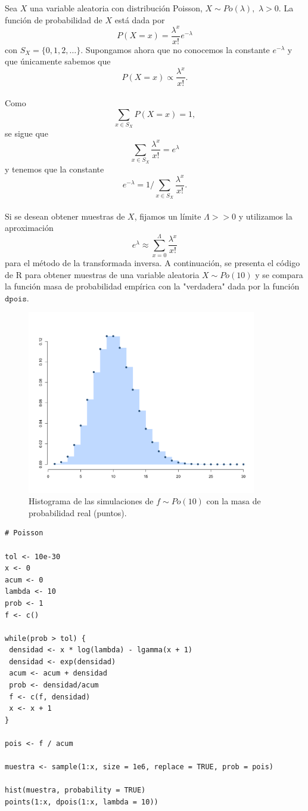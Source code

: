 \documentclass[11pt,a4paper]{article}
\begin{document}
Sea $X$ una variable aleatoria con distribución Poisson, $X \sim Po(\lambda),$ $\lambda > 0$. La función de probabilidad de $X$ está dada por
$$P(X = x) = \frac{\lambda ^ x}{x!}e^{-\lambda}$$ con $S_X = \lbrace 0, 1, 2, \dots \rbrace$. Supongamos ahora que no conocemos la constante $e^{-\lambda}$ y que únicamente sabemos que $$P(X = x) \propto  \frac{\lambda ^ x}{x!}.$$\\

Como $$\sum_{x \in S_X} P(X = x) = 1,$$ se sigue que $$\sum_{x \in S_X} \frac{\lambda ^ x}{x!} = e^{\lambda}$$ y tenemos que la constante $$e^{-\lambda} = 1 /\sum_{x \in S_X} \frac{\lambda ^ x}{x!}.$$\\

Si se desean obtener muestras de $X$, fijamos un límite $\Lambda >> 0$ y utilizamos la aproximación $$ e^{\lambda} \approx \sum_{x = 0}^{\Lambda} \frac{\lambda ^ x}{x!}$$ para el método de la transformada inversa. A continuación, se presenta el código de R para obtener muestras de una variable aleatoria $X \sim Po(10)$ y se compara la función masa de probabilidad empírica con la "verdadera" dada por la función $\mathtt{dpois}$.\\

\begin{figure}[H] 
\centering\includegraphics[width=10cm]{poisson.png}
\caption{Histograma de las simulaciones de $f \sim Po(10)$ con la masa de probabilidad real (puntos).}
\label{fig:poisson}
\end{figure}

\begin{lstlisting}
# Poisson

tol <- 10e-30
x <- 0
acum <- 0
lambda <- 10
prob <- 1
f <- c()

while(prob > tol) {
 densidad <- x * log(lambda) - lgamma(x + 1)
 densidad <- exp(densidad)
 acum <- acum + densidad
 prob <- densidad/acum
 f <- c(f, densidad)
 x <- x + 1
}

pois <- f / acum

muestra <- sample(1:x, size = 1e6, replace = TRUE, prob = pois)

hist(muestra, probability = TRUE)
points(1:x, dpois(1:x, lambda = 10))

\end{lstlisting}
\end{document}
